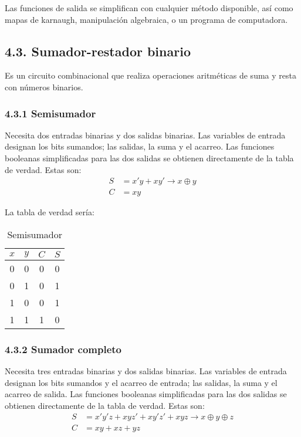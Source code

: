 Las funciones de salida se simplifican con cualquier m\'{e}todo disponible, as\'{i} como mapas de karnaugh,
manipulaci\'{o}n algebraica, o un programa de computadora.

\subsection*{4.3. Sumador-restador binario}
Es un circuito combinacional que realiza operaciones aritm\'{e}ticas de suma y resta con n\'{u}meros
binarios.
\newpage

\subsubsection*{4.3.1 Semisumador}
Necesita dos entradas binarias y dos salidas binarias. Las variables de entrada designan los bits sumandos;
las salidas, la suma y el acarreo. Las funciones booleanas simplificadas para las dos salidas se obtienen
directamente de la tabla de verdad. Estas son:
\begin{align*}
    S & = x'y + xy' \rightarrow x \oplus y \\
    C & = xy
\end{align*}

\begin{flushleft}
    La tabla de verdad ser\'{i}a:
\end{flushleft}

\begin{table}[h]
    \centering
    \begin{tabular}{cc|cc}
        \toprule
        $x$ & $y$ & $C$ & $S$ \\
        \midrule
        0   & 0   & 0   & 0   \\
        0   & 1   & 0   & 1   \\
        1   & 0   & 0   & 1   \\
        1   & 1   & 1   & 0   \\
        \bottomrule
    \end{tabular}
    \caption{Semisumador}
\end{table}

\subsubsection*{4.3.2 Sumador completo}
Necesita tres entradas binarias y dos salidas binarias. Las variables de entrada designan los bits sumandos
y el acarreo de entrada; las salidas, la suma y el acarreo de salida. Las funciones booleanas simplificadas
para las dos salidas se obtienen directamente de la tabla de verdad. Estas son:
\begin{align*}
    S & = x'y'z + xyz' + xy'z' + xyz \rightarrow x \oplus y \oplus z \\
    C & = xy + xz + yz
\end{align*}

